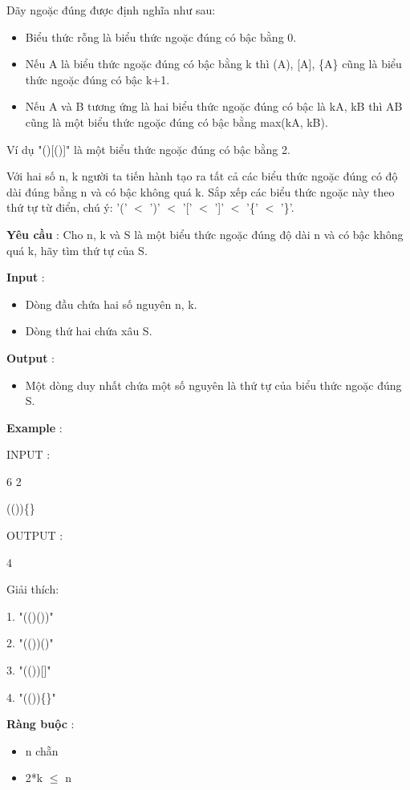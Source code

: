 



   Dãy ngoặc đúng được định nghĩa như sau:  
\begin{itemize}
	\item     Biểu thức rỗng là biểu thức ngoặc đúng có bậc bằng 0.   
	\item     Nếu A là biểu thức ngoặc đúng có bậc bằng k thì (A), [A], \{A\} cũng là biểu thức ngoặc đúng có bậc k+1.   
	\item     Nếu A và B tương ứng là hai biểu thức ngoặc đúng có bậc là kA, kB thì AB cũng là một biểu thức ngoặc đúng có bậc bằng max(kA, kB).   
\end{itemize}

   Ví dụ "()[()]" là một biểu thức ngoặc đúng có bậc bằng 2.  

   Với hai số n, k người ta tiến hành tạo ra tất cả các biểu thức ngoặc đúng có độ dài đúng bằng n và có bậc không quá k. Sắp xếp các biểu thức ngoặc này theo thứ tự từ điển, chú ý: '(' $<$ ')' $<$ '[' $<$ ']' $<$ '\{' $<$ '\}'.  

\textbf{      Yêu cầu     }   : Cho n, k và S là một biểu thức ngoặc đúng độ dài n và có bậc không quá k, hãy tìm thứ tự của S.  

\textbf{     Input    }   :  
\begin{itemize}
	\item     Dòng đầu chứa hai số nguyên n, k.   
	\item     Dòng thứ hai chứa xâu S.   
\end{itemize}

\textbf{      Output     }   :  
\begin{itemize}
	\item     Một dòng duy nhất chứa một số nguyên là thứ tự của biểu thức ngoặc đúng S.   
\end{itemize}

\textbf{      Example     }   :  

    INPUT      :   


   6 2   


   (())\{\}  

    OUTPUT      :   


   4  

   Giải thích:   


   1. "(()())"   


   2. "(())()"   


   3. "(())[]"   


   4. "(())\{\}"  

\textbf{      Ràng buộc     }   :  
\begin{itemize}
	\item     n chẵn   
	\item     2*k  $\le$  n   
\end{itemize}

